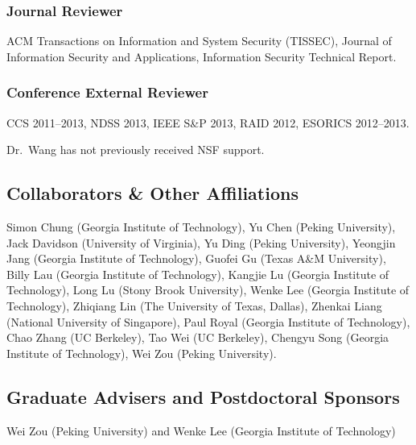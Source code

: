 \documentclass[letterpaper,twoside,11pt,headings=small]{scrartcl}
\newcommand{\basetitle}{TWC: Medium: Automated Reverse Engineering of Commodity Software}
\newcommand{\thetitle}{\basetitle\xspace}
\begin{document}
\subsubsection*{Journal Reviewer}

ACM Transactions on Information and System Security (TISSEC), Journal of Information Security and Applications, Information Security Technical Report.

\subsubsection*{Conference External Reviewer}

CCS 2011--2013, NDSS 2013, IEEE S\&P 2013, RAID 2012, ESORICS 2012--2013.

Dr.~Wang has not previously received NSF support.

\subsection*{Collaborators \& Other Affiliations}

Simon Chung (Georgia Institute of Technology),
Yu Chen (Peking University),
Jack Davidson (University of Virginia),
Yu Ding (Peking University),
Yeongjin Jang (Georgia Institute of Technology),
Guofei Gu (Texas A\&M University),
Billy Lau (Georgia Institute of Technology),
Kangjie Lu (Georgia Institute of Technology),
Long Lu (Stony Brook University),
Wenke Lee (Georgia Institute of Technology),
Zhiqiang Lin (The University of Texas, Dallas),
Zhenkai Liang (National University of Singapore),
Paul Royal (Georgia Institute of Technology),
Chao Zhang (UC Berkeley),
Tao Wei (UC Berkeley),
Chengyu Song (Georgia Institute of Technology),
Wei Zou (Peking University).

\subsection*{Graduate Advisers and Postdoctoral Sponsors}

Wei Zou (Peking University) and Wenke Lee (Georgia Institute of Technology)



\end{document}
